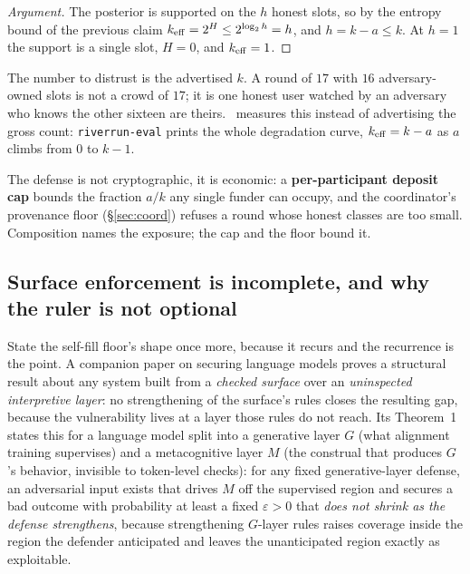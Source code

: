 \documentclass[11pt]{article}
\begin{document}
\begin{proof}[Argument]
The posterior is supported on the $h$ honest slots, so by the entropy bound of the
previous claim $k_{\mathrm{eff}} = 2^{H} \le 2^{\log_2 h} = h$, and $h = k - a \le k$. At $h = 1$ the
support is a single slot, $H = 0$, and $k_{\mathrm{eff}} = 1$.
\end{proof}

\begin{intuition}
The number to distrust is the advertised $k$. A round of $17$ with $16$ adversary-owned
slots is not a crowd of $17$; it is one honest user watched by an adversary who knows the
other sixteen are theirs. \river\ measures this instead of advertising the gross count:
\texttt{riverrun-eval} prints the whole degradation curve, $k_{\mathrm{eff}} = k - a$ as $a$ climbs
from $0$ to $k-1$.
\end{intuition}

The defense is not cryptographic, it is economic: a \textbf{per-participant deposit cap}
bounds the fraction $a/k$ any single funder can occupy, and the coordinator's provenance
floor (\S\ref{sec:coord}) refuses a round whose honest classes are too small. Composition
names the exposure; the cap and the floor bound it.

\subsection{Surface enforcement is incomplete, and why the ruler is not optional}
\label{sub:incompleteness}

State the self-fill floor's shape once more, because it recurs and the recurrence is the
point. A companion paper on securing language models \cite{galmanus2026d} proves a
structural result about any system built from a \emph{checked surface} over an
\emph{uninspected interpretive layer}: no strengthening of the surface's rules closes the
resulting gap, because the vulnerability lives at a layer those rules do not reach. Its
Theorem~1 states this for a language model split into a generative layer $G$ (what
alignment training supervises) and a metacognitive layer $M$ (the construal that produces
$G$'s behavior, invisible to token-level checks): for any fixed generative-layer defense,
an adversarial input exists that drives $M$ off the supervised region and secures a bad
outcome with probability at least a fixed $\varepsilon > 0$ that \emph{does not shrink as
the defense strengthens}, because strengthening $G$-layer rules raises coverage inside the
region the defender anticipated and leaves the unanticipated region exactly as
exploitable.
\end{document}

